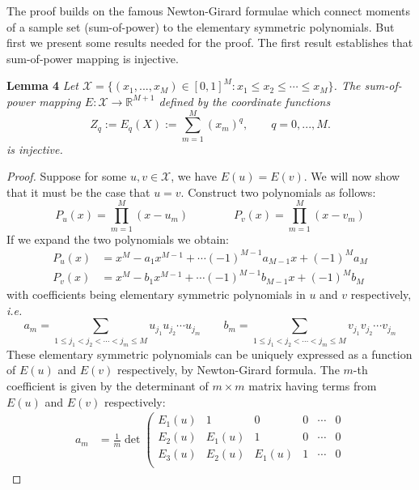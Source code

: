 \documentclass{article}
\newcommand{\latinphrase}[1]{\emph{#1}}    %
\newcommand{\ie}{\latinphrase{i.e.}\xspace}
\begin{document}
The proof builds on the famous Newton-Girard formulae which connect moments of a sample set (sum-of-power) to the elementary symmetric polynomials. But first we present some results needed for the proof. The first result establishes that sum-of-power mapping is injective.

\textbf{Lemma 4} {\em 
Let $\mathcal{X}=\{ (x_1,...,x_M) \in [0,1]^M : x_1 \leq x_2 \leq \cdots \leq x_M \}$. The sum-of-power mapping $E: \mathcal{X} \to \mathbb{R}^{M+1}$ defined by the coordinate functions
\begin{equation}
Z_q := E_q(X) := \sum_{m=1}^M (x_m)^q, \qquad q = 0, ..., M.
\end{equation}
is injective.
}
\begin{proof}
Suppose for some $u, v \in \mathcal{X}$, we have $E(u) = E(v)$. We will now show that it must be the case that $u=v$.
Construct two polynomials as follows:
\begin{equation}
P_u(x) = \prod_{m=1}^M (x-u_m) \qquad \qquad P_v(x) = \prod_{m=1}^M (x-v_m)
\end{equation}
If we expand the two polynomials we obtain:
\begin{equation}
\begin{aligned}
P_u(x) &= x^M - a_1x^{M-1} + \cdots (-1)^{M-1} a_{M-1}x + (-1)^{M} a_M  \\
P_v(x) &= x^M - b_1x^{M-1} + \cdots (-1)^{M-1} b_{M-1}x + (-1)^{M} b_M
\end{aligned}
\end{equation}
with coefficients being elementary symmetric polynomials in $u$ and $v$ respectively, \ie
\begin{equation}
a_m = \sum_{1\leq j_1 < j_2 < \cdots < j_m \leq M  } u_{j_1}u_{j_2}\cdots u_{j_m}
\qquad
b_m = \sum_{1\leq j_1 < j_2 < \cdots < j_m \leq M  } v_{j_1}v_{j_2}\cdots v_{j_m}
\end{equation}
These elementary symmetric polynomials can be uniquely expressed 
as a function of $E(u)$ and $E(v)$ respectively, by Newton-Girard formula. The $m$-th coefficient is given by the determinant of $m \times m$ matrix having terms from $E(u)$ and $E(v)$ respectively:
\begin{equation}
\begin{aligned}
a_m &= \frac{1}{m} \det \left( \begin{array}{cccccc}
E_1(u) & 1 & 0 & 0 & \cdots & 0 \\
E_2(u) & E_1(u) & 1 & 0 & \cdots & 0 \\
E_3(u) & E_2(u) & E_1(u) & 1 & \cdots & 0 \\

\end{array}
\end{aligned}
\end{equation}
\end{proof}
\end{document}

